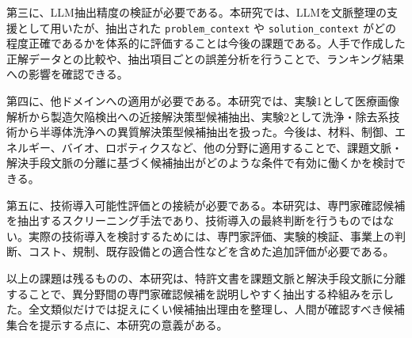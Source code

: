 第三に、LLM抽出精度の検証が必要である。本研究では、LLMを文脈整理の支援として用いたが、抽出された \texttt{problem\_context} や \texttt{solution\_context} がどの程度正確であるかを体系的に評価することは今後の課題である。人手で作成した正解データとの比較や、抽出項目ごとの誤差分析を行うことで、ランキング結果への影響を確認できる。

第四に、他ドメインへの適用が必要である。本研究では、実験1として医療画像解析から製造欠陥検出への近接解決策型候補抽出、実験2として洗浄・除去系技術から半導体洗浄への異質解決策型候補抽出を扱った。今後は、材料、制御、エネルギー、バイオ、ロボティクスなど、他の分野に適用することで、課題文脈・解決手段文脈の分離に基づく候補抽出がどのような条件で有効に働くかを検討できる。

第五に、技術導入可能性評価との接続が必要である。本研究は、専門家確認候補を抽出するスクリーニング手法であり、技術導入の最終判断を行うものではない。実際の技術導入を検討するためには、専門家評価、実験的検証、事業上の判断、コスト、規制、既存設備との適合性などを含めた追加評価が必要である。

以上の課題は残るものの、本研究は、特許文書を課題文脈と解決手段文脈に分離することで、異分野間の専門家確認候補を説明しやすく抽出する枠組みを示した。全文類似だけでは捉えにくい候補抽出理由を整理し、人間が確認すべき候補集合を提示する点に、本研究の意義がある。
